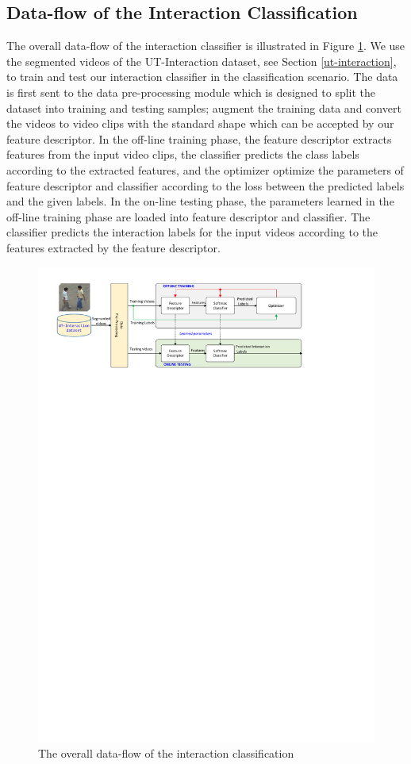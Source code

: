 \subsection{Data-flow of the Interaction Classification}
The overall data-flow of the interaction classifier is illustrated in Figure \ref{fig:df_classifier}. We use the segmented videos of the UT-Interaction dataset, see Section \ref{ut-interaction}, to train and test our interaction classifier in the classification scenario. The data is first sent to the data pre-processing module which is designed to split the dataset into training and testing samples; augment the training data and convert the videos to video clips with the standard shape which can be accepted by our feature descriptor. In the off-line training phase, the feature descriptor extracts features from  the input video clips, the classifier predicts the class labels according to the extracted features, and the optimizer optimize the parameters of feature descriptor and classifier according to the loss between the predicted labels and the given labels. In the on-line testing phase, the parameters learned in the off-line training phase are loaded into feature descriptor and classifier. The classifier predicts the interaction labels for the input videos according to the features extracted by the feature descriptor.
\begin{figure}
	\includegraphics[trim=1cm 23cm 0cm 1cm]{fig01/dataflow_classifier.pdf}
	\caption{The overall data-flow of the interaction classification}
	\label{fig:df_classifier}
\end{figure}

